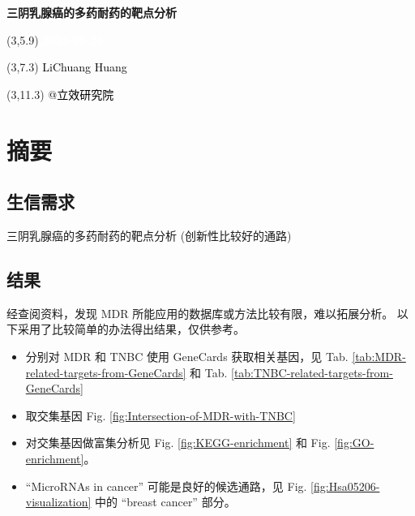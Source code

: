 \documentclass[
]{article}
\author{}
\date{\vspace{-2.5em}}
\providecommand{\tightlist}{%
  \setlength{\itemsep}{0pt}\setlength{\parskip}{0pt}}
\begin{document}
\begin{titlepage} 
\begin{center} \textbf{\Huge
三阴乳腺癌的多药耐药的靶点分析} \vspace{4em}
\begin{textblock}{10}(3,5.9) \huge
\textbf{\textcolor{white}{2024-05-23}}
\end{textblock} \begin{textblock}{10}(3,7.3)
\Large \textcolor{black}{LiChuang Huang}
\end{textblock} \begin{textblock}{10}(3,11.3)
\Large \textcolor{black}{@立效研究院}
\end{textblock} \end{center} \end{titlepage}
\restoregeometry


\tableofcontents

\listoffigures

\listoftables

\newpage


\hypertarget{abstract}{%
\section{摘要}\label{abstract}}

\hypertarget{ux751fux4fe1ux9700ux6c42}{%
\subsection{生信需求}\label{ux751fux4fe1ux9700ux6c42}}

三阴乳腺癌的多药耐药的靶点分析 (创新性比较好的通路)

\hypertarget{ux7ed3ux679c}{%
\subsection{结果}\label{ux7ed3ux679c}}

经查阅资料，发现 MDR 所能应用的数据库或方法比较有限，难以拓展分析。
以下采用了比较简单的办法得出结果，仅供参考。

\begin{itemize}
\tightlist
\item
  分别对 MDR 和 TNBC 使用 GeneCards 获取相关基因，见
  Tab. \ref{tab:MDR-related-targets-from-GeneCards} 和
  Tab. \ref{tab:TNBC-related-targets-from-GeneCards}
\item
  取交集基因 Fig. \ref{fig:Intersection-of-MDR-with-TNBC}
\item
  对交集基因做富集分析见 Fig. \ref{fig:KEGG-enrichment} 和 Fig. \ref{fig:GO-enrichment}。
\item
  ``MicroRNAs in cancer'' 可能是良好的候选通路，见 Fig. \ref{fig:Hsa05206-visualization} 中的 ``breast cancer'' 部分。
\end{itemize}
\end{document}

